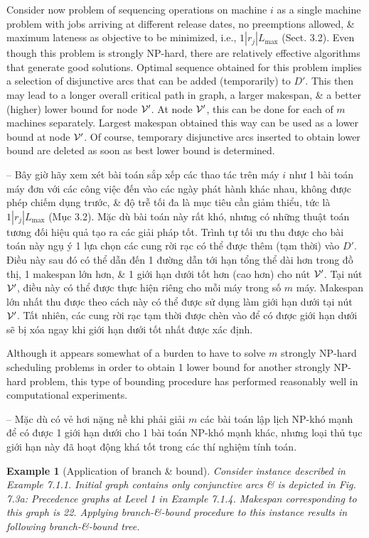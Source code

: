 \documentclass{article}
\newtheorem{example}{Example}
\begin{document}
\begin{itemize}
\begin{itemize}
        Consider now problem of sequencing operations on machine $i$ as a single machine problem with jobs arriving at different release dates, no preemptions allowed, \& maximum lateness as objective to be minimized, i.e., $1|r_j|L_{\max}$ (Sect. 3.2). Even though this problem is strongly NP-hard, there are relatively effective algorithms that generate good solutions. Optimal sequence obtained for this problem implies a selection of disjunctive arcs that can be added (temporarily) to $D'$. This then may lead to a longer overall critical path in graph, a larger makespan, \& a better (higher) lower bound for node ${\cal V}'$. At node ${\cal V}'$, this can be done for each of $m$ machines separately. Largest makespan obtained this way can be used as a lower bound at node ${\cal V}'$. Of course, temporary disjunctive arcs inserted to obtain lower bound are deleted as soon as best lower bound is determined.

        -- Bây giờ hãy xem xét bài toán sắp xếp các thao tác trên máy $i$ như 1 bài toán máy đơn với các công việc đến vào các ngày phát hành khác nhau, không được phép chiếm dụng trước, \& độ trễ tối đa là mục tiêu cần giảm thiểu, tức là $1|r_j|L_{\max}$ (Mục 3.2). Mặc dù bài toán này rất khó, nhưng có những thuật toán tương đối hiệu quả tạo ra các giải pháp tốt. Trình tự tối ưu thu được cho bài toán này ngụ ý 1 lựa chọn các cung rời rạc có thể được thêm (tạm thời) vào $D'$. Điều này sau đó có thể dẫn đến 1 đường dẫn tới hạn tổng thể dài hơn trong đồ thị, 1 makespan lớn hơn, \& 1 giới hạn dưới tốt hơn (cao hơn) cho nút ${\cal V}'$. Tại nút ${\cal V}'$, điều này có thể được thực hiện riêng cho mỗi máy trong số $m$ máy. Makespan lớn nhất thu được theo cách này có thể được sử dụng làm giới hạn dưới tại nút ${\cal V}'$. Tất nhiên, các cung rời rạc tạm thời được chèn vào để có được giới hạn dưới sẽ bị xóa ngay khi giới hạn dưới tốt nhất được xác định.

        Although it appears somewhat of a burden to have to solve $m$ strongly NP-hard scheduling problems in order to obtain 1 lower bound for another strongly NP-hard problem, this type of bounding procedure has performed reasonably well in computational experiments.

        -- Mặc dù có vẻ hơi nặng nề khi phải giải $m$ các bài toán lập lịch NP-khó mạnh để có được 1 giới hạn dưới cho 1 bài toán NP-khó mạnh khác, nhưng loại thủ tục giới hạn này đã hoạt động khá tốt trong các thí nghiệm tính toán.

        \begin{example}[Application of branch \& bound]
            Consider instance described in Example 7.1.1. Initial graph contains only conjunctive arcs \& is depicted in {\sf Fig. 7.3a: Precedence graphs at Level 1 in Example 7.1.4}. Makespan corresponding to this graph is 22. Applying branch-\&-bound procedure to this instance results in following branch-\&-bound tree.


\end{example}
\end{itemize}
\end{itemize}
\end{document}
